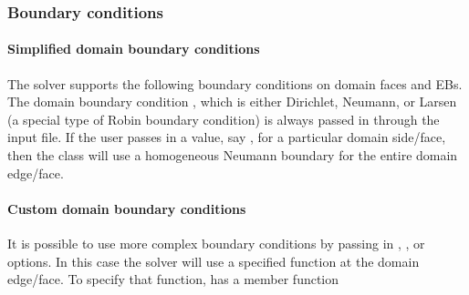 \documentclass[letterpaper,10pt,english]{sphinxmanual}
\begin{document}
\subsubsection{Boundary conditions}
\label{\detokenize{Solvers/RTE:boundary-conditions}}\label{\detokenize{Solvers/RTE:chap-eddingtonsp1bc}}

\paragraph{Simplified domain boundary conditions}
\label{\detokenize{Solvers/RTE:simplified-domain-boundary-conditions}}
The  solver supports the following boundary conditions on domain faces and EBs.
The domain boundary condition , which is either Dirichlet, Neumann, or Larsen (a special type of Robin boundary condition) is always passed in through the input file.
If the user passes in a value, say , for a particular domain side/face, then the class will use a homogeneous Neumann boundary for the entire domain edge/face.


\paragraph{Custom domain boundary conditions}
\label{\detokenize{Solvers/RTE:custom-domain-boundary-conditions}}
It is possible to use more complex boundary conditions by passing in , , or  options.
In this case the  solver will use a specified function at the domain edge/face.
To specify that function,  has a member function

\begin{sphinxVerbatim}[commandchars=\\\{\},formatcom=\scriptsize]
   
                               
                                    
\end{sphinxVerbatim}
\end{document}
